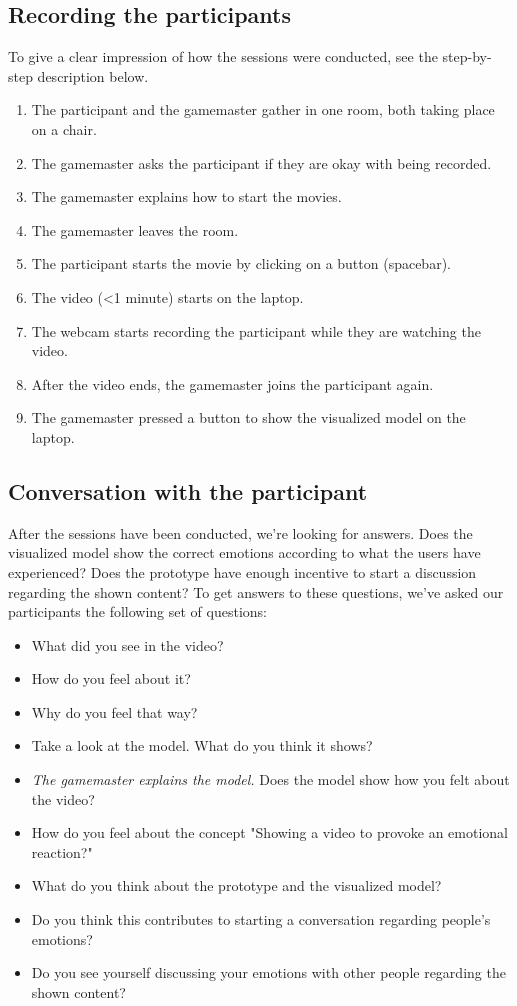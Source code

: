 \documentclass[sigconf]{acmart}
\begin{document}
\subsection{Recording the participants}
To give a clear impression of how the sessions were conducted, see the step-by-step description below.
\begin{enumerate}
    \item{The participant and the gamemaster gather in one room, both taking place on a chair.}
    \item{The gamemaster asks the participant if they are okay with being recorded.}
    \item{The gamemaster explains how to start the movies.}
    \item{The gamemaster leaves the room.}
    \item{The participant starts the movie by clicking on a button (spacebar).}
    \item{The video (<1 minute) starts on the laptop.}
    \item{The webcam starts recording the participant while they are watching the video.}
    \item{After the video ends, the gamemaster joins the participant again.}
    \item{The gamemaster pressed a button to show the visualized model on the laptop.}
\end{enumerate}

\subsection{Conversation with the participant}
After the sessions have been conducted, we’re looking for answers. Does the visualized model show the 
correct emotions according to what the users have experienced? Does the prototype have enough incentive to start 
a discussion regarding the shown content? To get answers to these questions, we've asked our participants 
the following set of questions:
\begin{itemize}
    \item{What did you see in the video?}
    \item{How do you feel about it?}
    \item{Why do you feel that way?}
    \item{Take a look at the model. What do you think it shows?}
    \item{\emph{The gamemaster explains the model.} Does the model show how you felt about the video?}
    \item{How do you feel about the concept "Showing a video to provoke an emotional reaction?"}
    \item{What do you think about the prototype and the visualized model?}
    \item{Do you think this contributes to starting a conversation regarding people's emotions?}
    \item{Do you see yourself discussing your emotions with other people regarding the shown content?}
\end{itemize}
\end{document}
